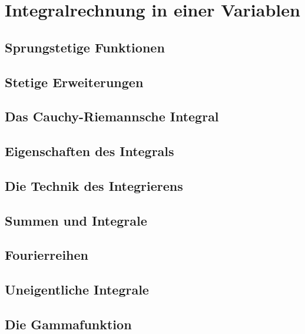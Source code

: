\chapter{Integralrechnung in einer Variablen}
\section{Sprungstetige Funktionen}
\section{Stetige Erweiterungen}
\section{Das Cauchy-Riemannsche Integral}
\section{Eigenschaften des Integrals}
\section{Die Technik des Integrierens}
\section{Summen und Integrale}
\section{Fourierreihen}
\section{Uneigentliche Integrale}
\section{Die Gammafunktion}
